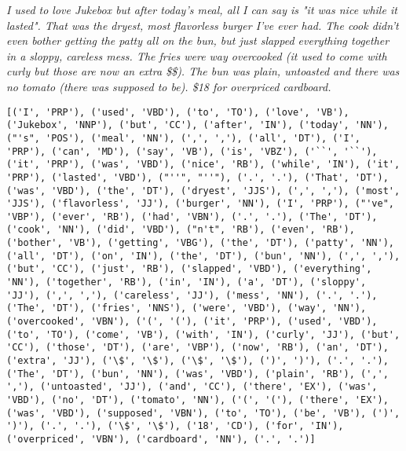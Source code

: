 \textit{I used to love Jukebox but after today's meal, all I can say is "it was nice while it lasted". That was the dryest, most flavorless burger I've ever had. The cook didn't even bother getting the patty all on the bun, but just slapped everything together in a sloppy, careless mess. The fries were way overcooked (it used to come with curly but those are now an extra \$\$). The bun was plain, untoasted and there was no tomato (there was supposed to be). \$18 for overpriced cardboard.}\\
\begin{Verbatim}[breaklines=true, breakanywhere=true] 
[('I', 'PRP'), ('used', 'VBD'), ('to', 'TO'), ('love', 'VB'), ('Jukebox', 'NNP'), ('but', 'CC'), ('after', 'IN'), ('today', 'NN'), ("'s", 'POS'), ('meal', 'NN'), (',', ','), ('all', 'DT'), ('I', 'PRP'), ('can', 'MD'), ('say', 'VB'), ('is', 'VBZ'), ('``', '``'), ('it', 'PRP'), ('was', 'VBD'), ('nice', 'RB'), ('while', 'IN'), ('it', 'PRP'), ('lasted', 'VBD'), ("''", "''"), ('.', '.'), ('That', 'DT'), ('was', 'VBD'), ('the', 'DT'), ('dryest', 'JJS'), (',', ','), ('most', 'JJS'), ('flavorless', 'JJ'), ('burger', 'NN'), ('I', 'PRP'), ("'ve", 'VBP'), ('ever', 'RB'), ('had', 'VBN'), ('.', '.'), ('The', 'DT'), ('cook', 'NN'), ('did', 'VBD'), ("n't", 'RB'), ('even', 'RB'), ('bother', 'VB'), ('getting', 'VBG'), ('the', 'DT'), ('patty', 'NN'), ('all', 'DT'), ('on', 'IN'), ('the', 'DT'), ('bun', 'NN'), (',', ','), ('but', 'CC'), ('just', 'RB'), ('slapped', 'VBD'), ('everything', 'NN'), ('together', 'RB'), ('in', 'IN'), ('a', 'DT'), ('sloppy', 'JJ'), (',', ','), ('careless', 'JJ'), ('mess', 'NN'), ('.', '.'), ('The', 'DT'), ('fries', 'NNS'), ('were', 'VBD'), ('way', 'NN'), ('overcooked', 'VBN'), ('(', '('), ('it', 'PRP'), ('used', 'VBD'), ('to', 'TO'), ('come', 'VB'), ('with', 'IN'), ('curly', 'JJ'), ('but', 'CC'), ('those', 'DT'), ('are', 'VBP'), ('now', 'RB'), ('an', 'DT'), ('extra', 'JJ'), ('\$', '\$'), ('\$', '\$'), (')', ')'), ('.', '.'), ('The', 'DT'), ('bun', 'NN'), ('was', 'VBD'), ('plain', 'RB'), (',', ','), ('untoasted', 'JJ'), ('and', 'CC'), ('there', 'EX'), ('was', 'VBD'), ('no', 'DT'), ('tomato', 'NN'), ('(', '('), ('there', 'EX'), ('was', 'VBD'), ('supposed', 'VBN'), ('to', 'TO'), ('be', 'VB'), (')', ')'), ('.', '.'), ('\$', '\$'), ('18', 'CD'), ('for', 'IN'), ('overpriced', 'VBN'), ('cardboard', 'NN'), ('.', '.')]
\end{Verbatim}
